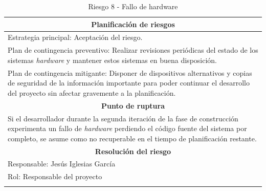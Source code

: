 \documentclass[12pt,a4paper, twoside]{report}
\begin{document}
\begin{longtable}{m{4cm}|m{5cm}|m{4cm}}
		\multicolumn{3}{|c|}{\textbf{Planificación de riesgos}} \\ \hline \hline
		\multicolumn{3}{|p{17cm}|}{Estrategia principal: Aceptación del riesgo.} \\ \hline			
		\multicolumn{3}{|p{17cm}|}{Plan de contingencia preventivo: Realizar revisiones periódicas del estado de los sistemas \textit{hardware} y mantener estos sistemas en buena disposición.} \\ \hline
		\multicolumn{3}{|p{17cm}|}{Plan de contingencia mitigante: Disponer de dispositivos alternativos y copias de seguridad de la información importante para poder continuar el desarrollo del proyecto sin afectar gravemente a la planificación.} \\ \hline
			
		\multicolumn{3}{|c|}{\textbf{Punto de ruptura}} \\ \hline \hline
		\multicolumn{3}{|p{17cm}|}{Si el desarrollador durante la segunda iteración de la fase de construcción experimenta un fallo de \textit{hardware} perdiendo el código fuente del sistema por completo, se asume como no recuperable en el tiempo de planificación restante.}\\ \hline
					
		\multicolumn{3}{|c|}{\textbf{Resolución del riesgo}} \\ \hline \hline
		\multicolumn{3}{|p{17cm}|}{Responsable: Jesús Iglesias García}\\ \hline
		\multicolumn{3}{|p{17cm}|}{Rol: Responsable del proyecto} \\ \hline
		\caption{Riesgo 8 - Fallo de hardware}
	\end{longtable}
	
	\newpage
	
\end{document}
